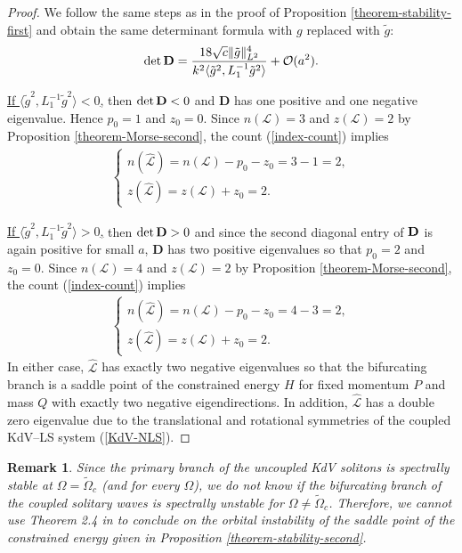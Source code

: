 \documentclass[12pt,reqno]{amsart}
\numberwithin{equation}{section}
\newtheorem{remark}{Remark}
\begin{document}
\begin{proof}
We follow the same steps as in the proof of Proposition \ref{theorem-stability-first} and obtain the same determinant formula with \(g\) replaced with \(\tilde{g}\):
\[ 
\det {\bf D} 
    = \frac{18 \sqrt{c} \| \tilde{g} \|^4_{L^2}}{k^2 \langle \tilde{g}^2, L_1^{-1} \tilde{g}^2 \rangle} + \mathcal{O}(a^2).
\]

\underline{If $\langle \tilde{g}^2, L_1^{-1} \tilde{g}^2 \rangle < 0$,} then 
$\det {\bf D}  < 0$ and \(\mathbf{D}\) has one positive and one negative eigenvalue. Hence \(p_0=1\) and \(z_0=0\). 
Since $n(\mathcal{L}) = 3$ and $z(\mathcal{L}) = 2$ by Proposition  \ref{theorem-Morse-second}, the count (\ref{index-count}) implies 
\begin{align*}
\left\{ \begin{array}{l} 
n(\hat{\mathcal{L}}) = n(\mathcal{L})-p_0-z_0=3-1=2, \\
z(\hat{\mathcal{L}}) = z(\mathcal{L}) + z_0 = 2.
\end{array} \right. 
\end{align*}

\underline{If $\langle \tilde{g}^2, L_1^{-1} \tilde{g}^2 \rangle > 0$,} then $\det {\bf D} > 0$ and since 
the second diagonal entry of ${\bf D}$ is again positive for small \(a\), \(\mathbf{D}\) has two positive eigenvalues 
so that $p_0 = 2$ and $z_0 = 0$. Since $n(\mathcal{L}) = 4$ and $z(\mathcal{L}) = 2$ by Proposition \ref{theorem-Morse-second}, 
the count (\ref{index-count}) implies 
\begin{align*}
\left\{ \begin{array}{l} 
n(\hat{\mathcal{L}}) = n(\mathcal{L})-p_0-z_0=4-3=2, \\
z(\hat{\mathcal{L}}) = z(\mathcal{L}) + z_0 = 2.
\end{array} \right. 
\end{align*}
In either case, \( \hat{\mathcal{L}} \) has exactly two negative eigenvalues so that the bifurcating branch is a saddle point of the constrained energy $H$ for fixed momentum $P$ and mass $Q$ with exactly two negative eigendirections. 
In addition, \( \hat{\mathcal{L}} \) has a double zero eigenvalue due to the translational and rotational symmetries of the coupled KdV--LS system (\ref{KdV-NLS}). 
\end{proof}

\begin{remark}
Since the primary branch of the uncoupled KdV solitons is spectrally stable at $\Omega = \widetilde{\Omega}_c$ (and for every $\Omega$), 
we do not know if the bifurcating branch of the coupled solitary waves is spectrally unstable for $\Omega \neq \widetilde{\Omega}_c$. 
Therefore, we cannot use  Theorem 2.4 in \cite{Dmitry} to conclude on the orbital instability of the saddle point of the constrained energy given in Proposition \ref{theorem-stability-second}.
\label{rem-instability}
\end{remark}
\end{document}
